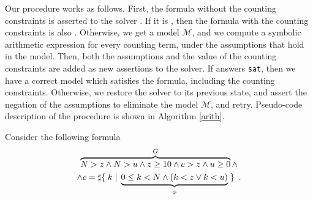 Our procedure works as follows. First, the formula without the
counting constraints is asserted to the solver \solver. If it is
\unsat, then the formula with the counting constraints is also
\sat. Otherwise, we get a model $\mathcal{M}$, and we
compute a symbolic arithmetic expression for every counting term,
under the assumptions that hold in the model. Then, both the
assumptions and the value of the counting constraints are added as new
assertions to the solver. If \solver answers \texttt{sat}, then we
have a correct model which satisfies the formula, including the
counting constraints. Otherwise, we restore the solver to its previous
state, and assert the negation of the assumptions to eliminate the
model $\mathcal{M}$, and retry. Pseudo-code description of the
procedure is shown in Algorithm \ref{arith}.

\begin{example}

Consider the following formula
\begin{multline*}
\overbrace{N > z \land N > u \land z \ge 10 \land c > z \land u \ge 0}^G \land \\
\land c = \sharp\lbrace\;k\;|\;\underbrace{0 \le k < N \land (k < z \lor k < u)}_\phi\;\rbrace\enspace.
\end{multline*}



\end{example}
